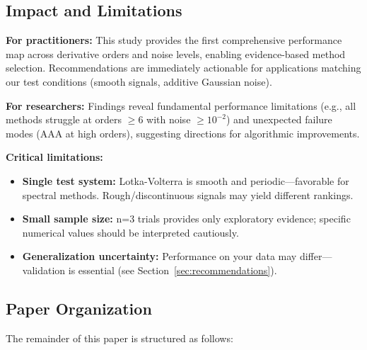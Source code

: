 \subsection{Impact and Limitations}
\label{sec:impact}

\textbf{For practitioners:} This study provides the first comprehensive performance map across derivative orders and noise levels, enabling evidence-based method selection. Recommendations are immediately actionable for applications matching our test conditions (smooth signals, additive Gaussian noise).

\textbf{For researchers:} Findings reveal fundamental performance limitations (e.g., all methods struggle at orders $\geq 6$ with noise $\geq 10^{-2}$) and unexpected failure modes (AAA at high orders), suggesting directions for algorithmic improvements.

\textbf{Critical limitations:}
\begin{itemize}
    \item \textbf{Single test system:} Lotka-Volterra is smooth and periodic—favorable for spectral methods. Rough/discontinuous signals may yield different rankings.
    \item \textbf{Small sample size:} n=3 trials provides only exploratory evidence; specific numerical values should be interpreted cautiously.
    \item \textbf{Generalization uncertainty:} Performance on your data may differ—validation is essential (see Section~\ref{sec:recommendations}).
\end{itemize}

\subsection{Paper Organization}
\label{sec:organization}

The remainder of this paper is structured as follows:


